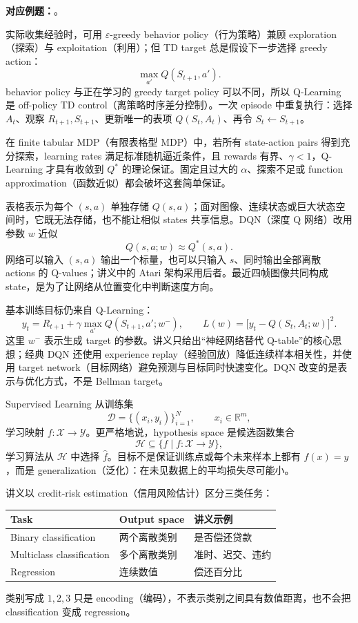 \textbf{对应例题：}。


实际收集经验时，可用 $\varepsilon$-greedy behavior policy（行为策略）兼顾 exploration（探索）与 exploitation（利用）；但 TD target 总是假设下一步选择 greedy action：
\[
  \max_{a'}Q(S_{t+1},a').
\]
behavior policy 与正在学习的 greedy target policy 可以不同，所以 Q-Learning 是 off-policy TD control（离策略时序差分控制）。一次 episode 中重复执行：选择 $A_t$、观察 $R_{t+1},S_{t+1}$、更新唯一的表项 $Q(S_t,A_t)$、再令 $S_t\leftarrow S_{t+1}$。

在 finite tabular MDP（有限表格型 MDP）中，若所有 state-action pairs 得到充分探索，learning rates 满足标准随机逼近条件，且 rewards 有界、$\gamma<1$，Q-Learning 才具有收敛到 $Q^*$ 的理论保证。固定且过大的 $\alpha$、探索不足或 function approximation（函数近似）都会破坏这套简单保证。


表格表示为每个 $(s,a)$ 单独存储 $Q(s,a)$；面对图像、连续状态或巨大状态空间时，它既无法存储，也不能让相似 states 共享信息。DQN（深度 Q 网络）改用参数 $w$ 近似
\[
  Q(s,a;w)\approx Q^*(s,a).
\]
网络可以输入 $(s,a)$ 输出一个标量，也可以只输入 $s$、同时输出全部离散 actions 的 Q-values；讲义中的 Atari 架构采用后者。最近四帧图像共同构成 state，是为了让网络从位置变化中判断速度方向。

基本训练目标仍来自 Q-Learning：
\[
  y_t=R_{t+1}+\gamma\max_{a'}Q(S_{t+1},a';w^-),
  \qquad
  L(w)=\bigl[y_t-Q(S_t,A_t;w)\bigr]^2.
\]
这里 $w^-$ 表示生成 target 的参数。讲义只给出“神经网络替代 Q-table”的核心思想；经典 DQN 还使用 experience replay（经验回放）降低连续样本相关性，并使用 target network（目标网络）避免预测与目标同时快速变化。DQN 改变的是表示与优化方式，不是 Bellman target。


Supervised Learning 从训练集
\[
  \mathcal D=\{(x_i,y_i)\}_{i=1}^{N},
  \qquad x_i\in\mathbb R^m,
\]
学习映射 $f:\mathcal X\to\mathcal Y$。更严格地说，hypothesis space 是候选函数集合
\[
  \mathcal H\subseteq\{f\mid f:\mathcal X\to\mathcal Y\},
\]
学习算法从 $\mathcal H$ 中选择 $\widehat f$。目标不是保证训练点或每个未来样本上都有 $f(x)=y$，而是 generalization（泛化）：在未见数据上的平均损失尽可能小。

讲义以 credit-risk estimation（信用风险估计）区分三类任务：
\begin{center}
\begin{tabularx}{0.9\textwidth}{@{}lXX@{}}
  \toprule
  Task & Output space & 讲义示例 \\
  \midrule
  Binary classification & 两个离散类别 & 是否偿还贷款 \\
  Multiclass classification & 多个离散类别 & 准时、迟交、违约 \\
  Regression & 连续数值 & 偿还百分比 \\
  \bottomrule
\end{tabularx}
\end{center}
类别写成 $1,2,3$ 只是 encoding（编码），不表示类别之间具有数值距离，也不会把 classification 变成 regression。


